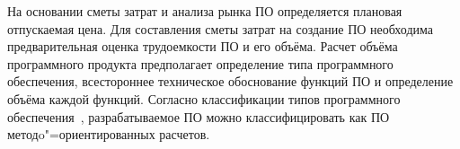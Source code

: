 \def \additionalSalaryRate{20}

\def \socialProtectionRate{34}

\def \bgsRate{0.7}

\def \businessTripRate{15}

\def \otherExpenseRate{20}

\def \overheadExpenseRate{100}

\def \profitability{35}

\def \localRepubTaxRate{3.9}

\def \vatRate{20}

\def \profitTaxRate{18}

\def \materialsRate{3}

\def \debugRate{15} %

\def \machineHourCost{2.5}

\def \supportAndAdaptationRate{30}

На основании сметы затрат и анализа рынка ПО определяется плановая отпускаемая цена.
Для составления сметы затрат на создание ПО необходима предварительная оценка трудоемкости ПО и его объёма.
Расчет объёма программного продукта предполагает определение типа программного обеспечения, всестороннее техническое обоснование функций ПО и определение объёма каждой функций.
Согласно классификации типов программного обеспечения~\cite[с.~59,~приложение 1]{palicyn_2006}, разрабатываемое ПО можно классифицировать как ПО методo"=ориентированных расчетов.

